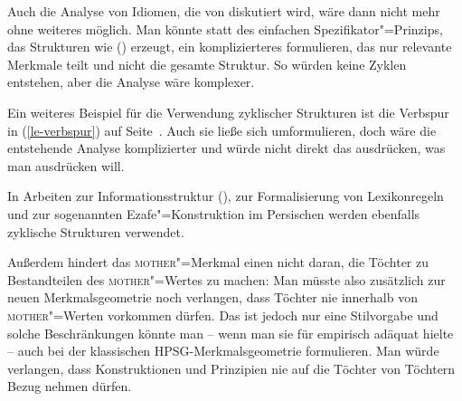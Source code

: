 Auch die Analyse von Idiomen, die von \citet{SS2003a}
diskutiert wird, wäre dann nicht mehr ohne weiteres möglich. Man könnte statt des einfachen
Spezifikator"=Prinzips, das Strukturen wie () erzeugt, ein komplizierteres formulieren, das
nur relevante Merkmale teilt und nicht die gesamte Struktur. So würden keine Zyklen entstehen, aber
die Analyse wäre komplexer. 

Ein weiteres Beispiel für die Verwendung zyklischer Strukturen ist die Verbspur in
(\ref{le-verbspur}) auf Seite~\pageref{le-verbspur}. Auch sie ließe sich umformulieren, doch wäre
die entstehende Analyse komplizierter und würde nicht direkt das ausdrücken, was man ausdrücken will.%

In Arbeiten zur Informationsstruktur (\citealp[]{EV94a}), zur
Formalisierung von Lexikonregeln \citep[]{Meurers2001a} und zur
sogenannten Ezafe"=Konstruktion im Persischen \citep[]{Samvelian2007a} werden
ebenfalls zyklische Strukturen verwendet.



Außerdem hindert das \textsc{mother}"=Merkmal einen nicht daran, die Töchter zu Bestandteilen des \textsc{mother}"=Wertes zu machen:
\ea
\label{sb-cxg-daughters-in-mother}
\z
Man müsste also zusätzlich zur neuen Merkmalsgeometrie noch verlangen, dass Töchter nie innerhalb
von \textsc{mother}"=Werten vorkommen dürfen. Das ist jedoch nur eine Stilvorgabe und solche
Beschränkungen könnte man -- wenn man sie für empirisch adäquat hielte -- auch bei der
klassischen HPSG-Merkmalsgeometrie formulieren. Man würde verlangen, dass Konstruktionen und Prinzipien nie auf die
Töchter von Töchtern Bezug nehmen dürfen.

